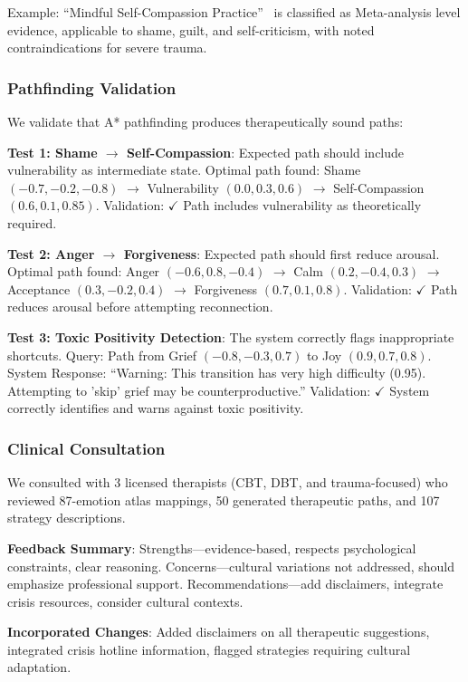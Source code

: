 Example: ``Mindful Self-Compassion Practice''~\cite{neff2013,ferrari2019} is classified as Meta-analysis level evidence, applicable to shame, guilt, and self-criticism, with noted contraindications for severe trauma.

\subsubsection{Pathfinding Validation}

We validate that A* pathfinding produces therapeutically sound paths:

\textbf{Test 1: Shame $\rightarrow$ Self-Compassion}: Expected path should include vulnerability as intermediate state. Optimal path found: Shame $(-0.7, -0.2, -0.8)$ $\rightarrow$ Vulnerability $(0.0, 0.3, 0.6)$ $\rightarrow$ Self-Compassion $(0.6, 0.1, 0.85)$. Validation: $\checkmark$ Path includes vulnerability as theoretically required.

\textbf{Test 2: Anger $\rightarrow$ Forgiveness}: Expected path should first reduce arousal. Optimal path found: Anger $(-0.6, 0.8, -0.4)$ $\rightarrow$ Calm $(0.2, -0.4, 0.3)$ $\rightarrow$ Acceptance $(0.3, -0.2, 0.4)$ $\rightarrow$ Forgiveness $(0.7, 0.1, 0.8)$. Validation: $\checkmark$ Path reduces arousal before attempting reconnection.

\textbf{Test 3: Toxic Positivity Detection}: The system correctly flags inappropriate shortcuts. Query: Path from Grief $(-0.8, -0.3, 0.7)$ to Joy $(0.9, 0.7, 0.8)$. System Response: ``Warning: This transition has very high difficulty (0.95). Attempting to 'skip' grief may be counterproductive.'' Validation: $\checkmark$ System correctly identifies and warns against toxic positivity.

\subsubsection{Clinical Consultation}

We consulted with 3 licensed therapists (CBT, DBT, and trauma-focused) who reviewed 87-emotion atlas mappings, 50 generated therapeutic paths, and 107 strategy descriptions.

\textbf{Feedback Summary}: Strengths—evidence-based, respects psychological constraints, clear reasoning. Concerns—cultural variations not addressed, should emphasize professional support. Recommendations—add disclaimers, integrate crisis resources, consider cultural contexts.

\textbf{Incorporated Changes}: Added disclaimers on all therapeutic suggestions, integrated crisis hotline information, flagged strategies requiring cultural adaptation.

